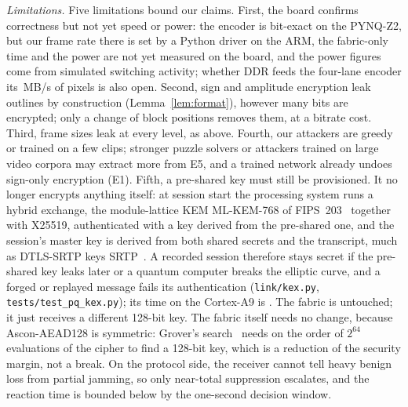 \textit{Limitations.} Five limitations bound our claims. First, the board confirms correctness but not yet speed or power: the encoder is bit-exact on the PYNQ-Z2, but our frame rate there is set by a Python driver on the ARM, the fabric-only time and the power are not yet measured on the board, and the power figures come from simulated switching activity; whether DDR feeds the four-lane encoder its \RtlFourLanesInMBs\,MB/s of pixels is also open. Second, sign and amplitude encryption leak outlines by construction (Lemma~\ref{lem:format}), however many bits are encrypted; only a change of block positions removes them, at a bitrate cost. Third, frame sizes leak at every level, as above. Fourth, our attackers are greedy or trained on a few clips; stronger puzzle solvers or attackers trained on large video corpora may extract more from E5, and a trained network already undoes sign-only encryption (E1). Fifth, a pre-shared key must still be provisioned. It no longer encrypts anything itself: at session start the processing system runs a hybrid exchange, the module-lattice KEM ML-KEM-768 of FIPS~203~\cite{fips203} together with X25519, authenticated with a key derived from the pre-shared one, and the session's master key is derived from both shared secrets and the transcript, much as DTLS-SRTP keys SRTP~\cite{rfc3711}. A recorded session therefore stays secret if the pre-shared key leaks later or a quantum computer breaks the elliptic curve, and a forged or replayed message fails its authentication (\texttt{link/kex.py}, \texttt{tests/test\_pq\_kex.py}); its time on the Cortex-A9 is . The fabric is untouched; it just receives a different 128-bit key. The fabric itself needs no change, because Ascon-AEAD128 is symmetric: Grover's search~\cite{grover1996} needs on the order of $2^{64}$ evaluations of the cipher to find a 128-bit key, which is a reduction of the security margin, not a break. On the protocol side, the receiver cannot tell heavy benign loss from partial jamming, so only near-total suppression escalates, and the reaction time is bounded below by the one-second decision window.

